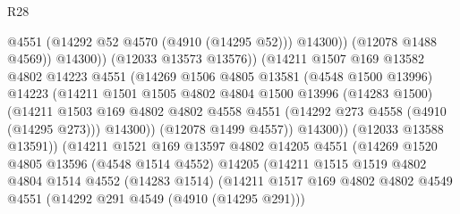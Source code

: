 \begin{lexlean}{R28}
\begin{coremodule}
                                      @4551
                                      (@14292 @52 @4570 (@4910 (@14295 @52)))
                                      @14300))
                                  (@12078 @1488 @4569))
                                @14300))
                            (@12033 @13573 @13576))
                          (@14211
                            @1507
                            @169
                            @13582
                            @4802
                            @14223
                            @4551
                            (@14269
                              @1506
                              @4805
                              @13581
                              (@4548 @1500 @13996)
                              @14223
                              (@14211
                                @1501
                                @1505
                                @4802
                                @4804
                                @1500
                                @13996
                                (@14283 @1500)
                                (@14211
                                  @1503
                                  @169
                                  @4802
                                  @4802
                                  @4558
                                  @4551
                                  (@14292 @273 @4558 (@4910 (@14295 @273)))
                                  @14300))
                              (@12078 @1499 @4557))
                            @14300))
                        (@12033 @13588 @13591))
                      (@14211
                        @1521
                        @169
                        @13597
                        @4802
                        @14205
                        @4551
                        (@14269
                          @1520
                          @4805
                          @13596
                          (@4548 @1514 @4552)
                          @14205
                          (@14211
                            @1515
                            @1519
                            @4802
                            @4804
                            @1514
                            @4552
                            (@14283 @1514)
                            (@14211
                              @1517
                              @169
                              @4802
                              @4802
                              @4549
                              @4551
                              (@14292 @291 @4549 (@4910 (@14295 @291)))

\end{coremodule}
\end{lexlean}
